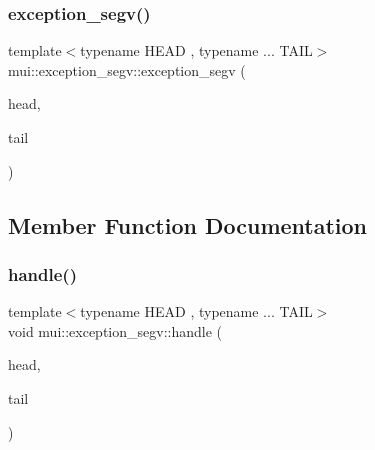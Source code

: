 \mbox{\label{structmui_1_1exception__segv_aecea0ce4316060d83687d8b7c053dfd3}} 
\subsubsection{\texorpdfstring{exception\+\_\+segv()}{exception\_segv()}\hspace{0.1cm}{\footnotesize\ttfamily [2/2]}}
{\footnotesize\ttfamily template$<$typename H\+E\+AD , typename ... T\+A\+IL$>$ \\
mui\+::exception\+\_\+segv\+::exception\+\_\+segv (\begin{DoxyParamCaption}\item[{H\+E\+AD const \&}]{head,  }\item[{T\+A\+IL const \&...}]{tail }\end{DoxyParamCaption})\hspace{0.3cm}{\ttfamily [inline]}}



\subsection{Member Function Documentation}
\mbox{\label{structmui_1_1exception__segv_a2a0e173d21952400fa3aab0ec418338c}} 
\subsubsection{\texorpdfstring{handle()}{handle()}\hspace{0.1cm}{\footnotesize\ttfamily [1/2]}}
{\footnotesize\ttfamily template$<$typename H\+E\+AD , typename ... T\+A\+IL$>$ \\
void mui\+::exception\+\_\+segv\+::handle (\begin{DoxyParamCaption}\item[{H\+E\+AD const \&}]{head,  }\item[{T\+A\+IL const \&...}]{tail }\end{DoxyParamCaption})\hspace{0.3cm}{\ttfamily [inline]}}

